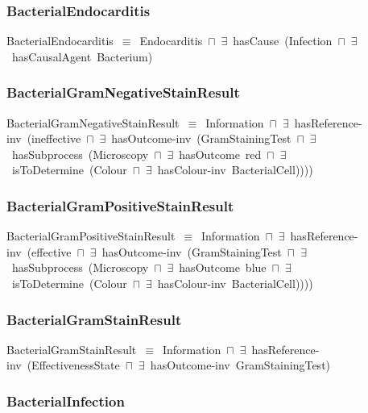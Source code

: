 \documentclass{article}
\begin{document}
\subsubsection*{BacterialEndocarditis}

BacterialEndocarditis~\ensuremath{\equiv}~Endocarditis~\ensuremath{\sqcap}~\ensuremath{\exists}~hasCause~(Infection~\ensuremath{\sqcap}~\ensuremath{\exists}~hasCausalAgent~Bacterium)

\subsubsection*{BacterialGramNegativeStainResult}

BacterialGramNegativeStainResult~\ensuremath{\equiv}~Information~\ensuremath{\sqcap}~\ensuremath{\exists}~hasReference-inv~(ineffective~\ensuremath{\sqcap}~\ensuremath{\exists}~hasOutcome-inv~(GramStainingTest~\ensuremath{\sqcap}~\ensuremath{\exists}~hasSubprocess~(Microscopy~\ensuremath{\sqcap}~\ensuremath{\exists}~hasOutcome~red~\ensuremath{\sqcap}~\ensuremath{\exists}~isToDetermine~(Colour~\ensuremath{\sqcap}~\ensuremath{\exists}~hasColour-inv~BacterialCell))))

\subsubsection*{BacterialGramPositiveStainResult}

BacterialGramPositiveStainResult~\ensuremath{\equiv}~Information~\ensuremath{\sqcap}~\ensuremath{\exists}~hasReference-inv~(effective~\ensuremath{\sqcap}~\ensuremath{\exists}~hasOutcome-inv~(GramStainingTest~\ensuremath{\sqcap}~\ensuremath{\exists}~hasSubprocess~(Microscopy~\ensuremath{\sqcap}~\ensuremath{\exists}~hasOutcome~blue~\ensuremath{\sqcap}~\ensuremath{\exists}~isToDetermine~(Colour~\ensuremath{\sqcap}~\ensuremath{\exists}~hasColour-inv~BacterialCell))))

\subsubsection*{BacterialGramStainResult}

BacterialGramStainResult~\ensuremath{\equiv}~Information~\ensuremath{\sqcap}~\ensuremath{\exists}~hasReference-inv~(EffectivenessState~\ensuremath{\sqcap}~\ensuremath{\exists}~hasOutcome-inv~GramStainingTest)

\subsubsection*{BacterialInfection}
\end{document}
